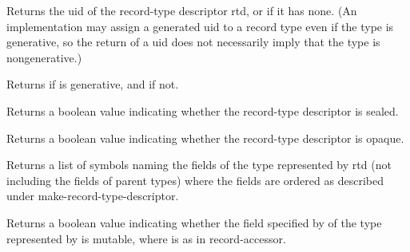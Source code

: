 \begin{entry}{%
}
   
Returns the uid of the record-type descriptor rtd, or \schfalse{} if it has none.
(An implementation may assign a generated uid to a record type even if the
type is generative, so the return of a uid does not necessarily imply that
the type is nongenerative.)
\end{entry}

\begin{entry}{%
}
   
Returns \schtrue{} if  is generative, and \schfalse{} if not.
\end{entry}

\begin{entry}{%
}

Returns a boolean value indicating whether the record-type descriptor is
sealed.
\end{entry}

\begin{entry}{%
}
   
Returns a boolean value indicating whether the record-type descriptor is
opaque.
\end{entry}

\begin{entry}{%
}
   
Returns a list of symbols naming the fields of the type represented by rtd
(not including the fields of parent types) where the fields are ordered as
described under {\cf make-record-type-descriptor}.
\end{entry}

\begin{entry}{%
}
   
Returns a boolean value indicating whether the field specified by
 of the type represented by  is mutable, where 
is as in {\cf record-accessor}.
\end{entry}


